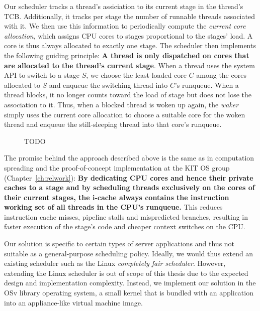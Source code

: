 \documentclass[12pt,a4paper]{book}
\begin{document}
Our scheduler tracks a thread's assiciation to its current stage in the thread's TCB.
Additionally, it tracks per stage the number of runnable threads associated with it.
We then use this information to periodically compute the \emph{current core allocation}, which assigns CPU cores to stages proportional to the stages' load.
A core is thus always allocated to exactly one stage. %
The scheduler then implements the following guiding principle: \textbf{A thread is only dispatched on cores that are allocated to the thread's current stage}.
When a thread uses the system API to switch to a stage $S$, we choose the least-loaded core $C$ among the cores allocated to $S$ and enqueue the switching thread into $C$'s runqueue.
When a thread blocks, it no longer counts toward the load of stage but does not lose the association to it.
Thus, when a blocked thread is woken up again, the \emph{waker} simply uses the current core allocation to choose a suitable core for the woken thread and enqueue the still-sleeping thread into that core's runqueue.

\begin{figure}[h]
    \caption{TODO}
\end{figure}

The promise behind the approach described above is the same as in computation spreading and the proof-of-concept implementation at the KIT OS group (Chapter~\ref{ch:relwork}):
\textbf{By dedicating CPU cores and hence their private caches to a stage and by scheduling threads exclusively on the cores of their current stages, the i-cache always contains the instruction working set of all threads in the CPU's runqueue.}
This reduces instruction cache misses, pipeline stalls and mispredicted branches, resulting in faster execution of the stage's code and cheaper context switches on the CPU.

Our solution is specific to certain types of server applications and thus not suitable as a general-purpose scheduling policy.
Ideally, we would thus extend an existing scheduler such as the Linux \emph{completely fair scheduler}.
However, extending the Linux scheduler is out of scope of this thesis due to the expected design and implementation complexity.
Instead, we implement our solution in the OSv library operating system, a small kernel that is bundled with an application into an appliance-like virtual machine image.
\end{document}
